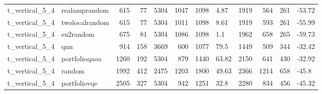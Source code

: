\begin{longtable}{llrrrrrlrrrl}
t\_vertical\_5\_4 & realamprandom & 615 & 77 & 5304 & 1047 & 1098 & 4.87 & 1919 & 564 & 261 & -53.72 \\
t\_vertical\_5\_4 & twolocalrandom & 615 & 77 & 5304 & 1011 & 1098 & 8.61 & 1919 & 593 & 261 & -55.99 \\
t\_vertical\_5\_4 & su2random & 675 & 81 & 5304 & 1086 & 1098 & 1.1 & 1962 & 658 & 265 & -59.73 \\
t\_vertical\_5\_4 & qnn & 914 & 158 & 3669 & 600 & 1077 & 79.5 & 1449 & 509 & 344 & -32.42 \\
t\_vertical\_5\_4 & portfolioqaoa & 1260 & 192 & 5304 & 879 & 1440 & 63.82 & 2150 & 641 & 430 & -32.92 \\
t\_vertical\_5\_4 & random & 1992 & 412 & 2475 & 1203 & 1800 & 49.63 & 2366 & 1214 & 658 & -45.8 \\
t\_vertical\_5\_4 & portfoliovqe & 2505 & 327 & 5304 & 942 & 1251 & 32.8 & 2280 & 834 & 456 & -45.32 \\
\end{longtable}

